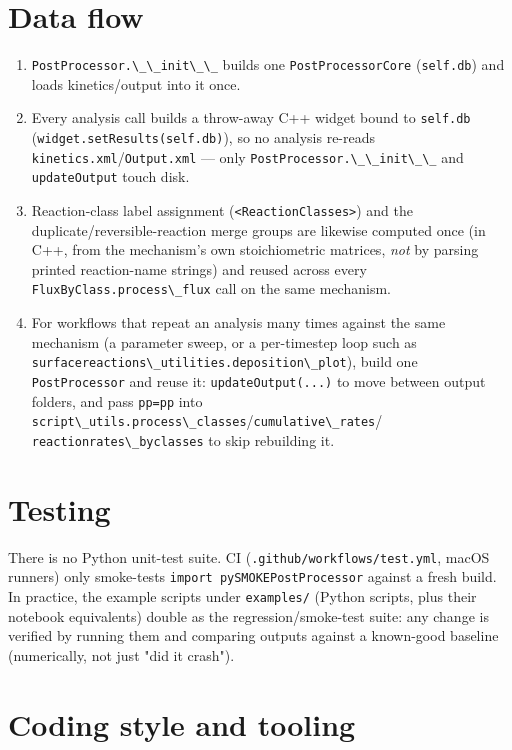 \documentclass[11pt,a4paper]{report}
\newcommand{\pkg}[1]{\lstinline|#1|}
\begin{document}
\chapter{Data flow}

\begin{enumerate}
\item \pkg{PostProcessor.\_\_init\_\_} builds one \pkg{PostProcessorCore}
  (\pkg{self.db}) and loads kinetics/output into it once.
\item Every analysis call builds a throw-away C++ widget bound to
  \pkg{self.db} (\pkg{widget.setResults(self.db)}), so no analysis re-reads
  \pkg{kinetics.xml}/\pkg{Output.xml} --- only \pkg{PostProcessor.\_\_init\_\_}
  and \pkg{updateOutput} touch disk.
\item Reaction-class label assignment (\pkg{<ReactionClasses>}) and the
  duplicate/reversible-reaction merge groups are likewise computed once (in
  C++, from the mechanism's own stoichiometric matrices, \emph{not} by
  parsing printed reaction-name strings) and reused across every
  \pkg{FluxByClass.process\_flux} call on the same mechanism.
\item For workflows that repeat an analysis many times against the same
  mechanism (a parameter sweep, or a per-timestep loop such as
  \pkg{surfacereactions\_utilities.deposition\_plot}), build one
  \pkg{PostProcessor} and reuse it: \pkg{updateOutput(...)} to move between
  output folders, and pass \pkg{pp=pp} into
  \pkg{script\_utils.process\_classes}/\pkg{cumulative\_rates}/
  \pkg{reactionrates\_byclasses} to skip rebuilding it.
\end{enumerate}

\chapter{Testing}

There is no Python unit-test suite. CI
(\pkg{.github/workflows/test.yml}, macOS runners) only smoke-tests
\pkg{import pySMOKEPostProcessor} against a fresh build. In practice, the
example scripts under \pkg{examples/} (Python scripts, plus their notebook
equivalents) double as the regression/smoke-test suite: any change is
verified by running them and comparing outputs against a known-good
baseline (numerically, not just "did it crash").

\chapter{Coding style and tooling}
\end{document}
